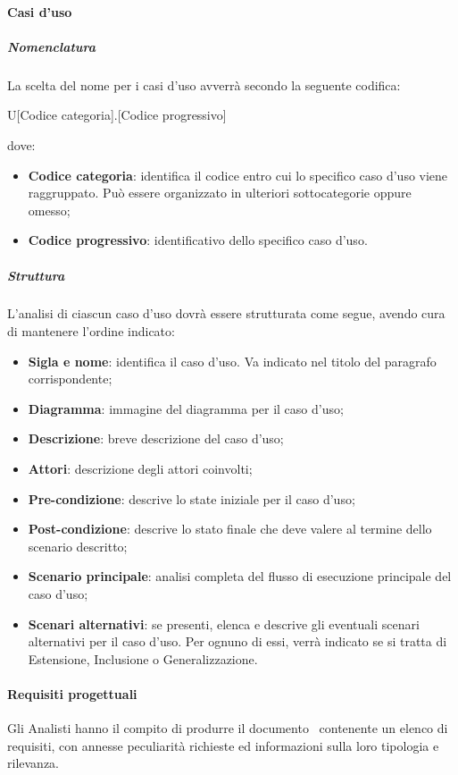 		\paragraph{Casi d'uso}
		
			\subparagraph{Nomenclatura}
			La scelta del nome per i casi d'uso avverrà secondo la seguente codifica:
			\begin{center}
				U[Codice categoria].[Codice progressivo]
			\end{center}
			dove:
			\begin{itemize}
				\item\textbf{Codice categoria}: identifica il codice entro cui lo specifico caso d'uso viene raggruppato. Può essere organizzato in ulteriori sottocategorie oppure omesso;
				\item\textbf{Codice progressivo}: identificativo dello specifico caso d'uso.
			\end{itemize}
			
			\subparagraph{Struttura}
			L'analisi di ciascun caso d'uso dovrà essere strutturata come segue, avendo cura di mantenere l'ordine indicato:
			\begin{itemize}
				\item\textbf{Sigla e nome}: identifica il caso d'uso. Va indicato nel titolo del paragrafo corrispondente;
				\item\textbf{Diagramma}: immagine del diagramma per il caso d'uso;
				\item\textbf{Descrizione}: breve descrizione del caso d'uso;
				\item\textbf{Attori}: descrizione degli attori coinvolti;
				\item\textbf{Pre-condizione}: descrive lo state iniziale per il caso d'uso;
				\item\textbf{Post-condizione}: descrive lo stato finale che deve valere al termine dello scenario descritto;
				\item\textbf{Scenario principale}: analisi completa del flusso di esecuzione principale del caso d'uso;
				\item\textbf{Scenari alternativi}: se presenti, elenca e descrive gli eventuali scenari alternativi per il caso d'uso. Per ognuno di essi, verrà indicato se si tratta di Estensione, Inclusione o Generalizzazione.
			\end{itemize}
		
		\paragraph{Requisiti progettuali}
		Gli Analisti hanno il compito di produrre il documento \AdR\ contenente un elenco di requisiti, con annesse peculiarità richieste ed informazioni sulla loro tipologia e rilevanza.
		
